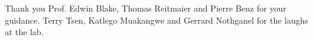 
Thank you Prof. Edwin Blake, Thomas Reitmaier and Pierre Benz for your guidance. Terry Tsen, Katlego Muakangwe and Gerrard Nothganel for the laughs at the lab.\newline